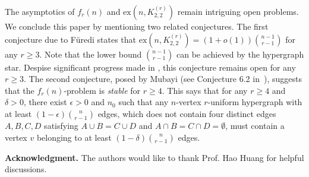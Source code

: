 \documentclass[11pt]{article}
\def\ex{\mathrm{ex}}
\begin{document}
The asymptotics of $f_r(n)$ and $\ex(n,K_{2,2}^{(r)})$ remain intriguing open problems. 
We conclude this paper by mentioning two related conjectures. 
The first conjecture due to F\"uredi \cite{Fu84} states that $\ex(n,K_{2,2}^{(r)})=(1+o(1))\binom{n-1}{r-1}$ for any $r\geq 3$. 
Note that the lower bound $\binom{n-1}{r-1}$ can be achieved by the hypergraph star.
Despise significant progress made in \cite{MuVe04,PiVe09}, this conjecture remains open for any $r\geq 3$.
The second conjecture, posed by Mubayi (see Conjecture 6.2 in~\cite{Mu07}), suggests that the $f_r(n)$-problem is {\it stable} for $r\geq 4$.
This says that for any $r\geq 4$ and $\delta>0$, there exist $\epsilon>0$ and $n_0$ such that any $n$-vertex $r$-uniform hypergraph with at least $(1-\epsilon)\binom{n}{r-1}$ edges, which does not contain four distinct edges $A, B, C, D$ satisfying $A\cup B=C\cup D$ and $A\cap B=C\cap D=\emptyset$, must contain a vertex $v$ belonging to at least $(1-\delta)\binom{n}{r-1}$ edges.

\bigskip
\medskip

{\noindent\bf Acknowledgment.} The authors would like to thank Prof. Hao Huang for helpful discussions.
\end{document}

